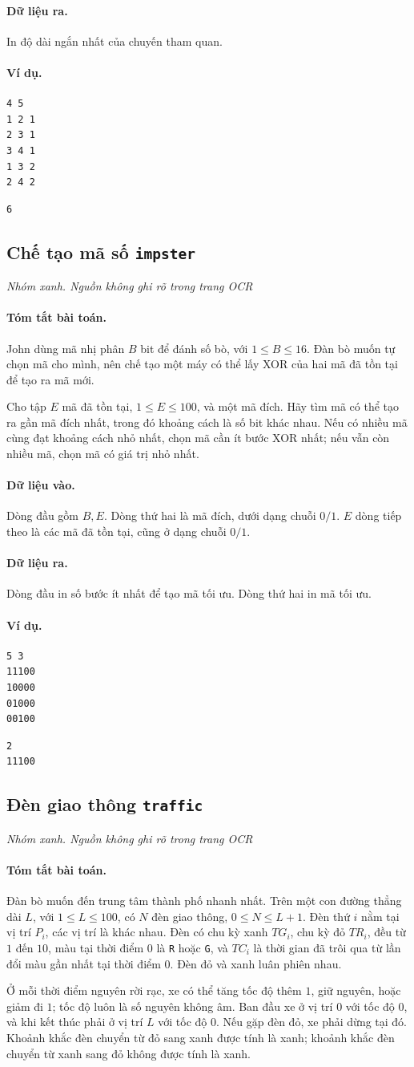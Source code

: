\documentclass[11pt]{article}
\newcommand{\problem}[4]{%
  \subsection[#1 (#2)]{#1 \hfill {\normalsize\texttt{#2}}}%
  \noindent\textit{#3. #4}\par\smallskip
}
\newcommand{\iosec}[1]{\paragraph{#1}}
\begin{document}
\iosec{Dữ liệu ra.}
In độ dài ngắn nhất của chuyến tham quan.

\iosec{Ví dụ.}
\begin{verbatim}
4 5
1 2 1
2 3 1
3 4 1
1 3 2
2 4 2
\end{verbatim}

\begin{verbatim}
6
\end{verbatim}

\problem{Chế tạo mã số}{impster}{Nhóm xanh}{Nguồn không ghi rõ trong trang OCR}

\iosec{Tóm tắt bài toán.}
John dùng mã nhị phân \(B\) bit để đánh số bò, với \(1\le B\le 16\). Đàn bò
muốn tự chọn mã cho mình, nên chế tạo một máy có thể lấy XOR của hai mã đã tồn
tại để tạo ra mã mới.

Cho tập \(E\) mã đã tồn tại, \(1\le E\le 100\), và một mã đích. Hãy tìm mã có
thể tạo ra gần mã đích nhất, trong đó khoảng cách là số bit khác nhau. Nếu có
nhiều mã cùng đạt khoảng cách nhỏ nhất, chọn mã cần ít bước XOR nhất; nếu vẫn
còn nhiều mã, chọn mã có giá trị nhỏ nhất.

\iosec{Dữ liệu vào.}
Dòng đầu gồm \(B,E\). Dòng thứ hai là mã đích, dưới dạng chuỗi \(0/1\). \(E\)
dòng tiếp theo là các mã đã tồn tại, cũng ở dạng chuỗi \(0/1\).

\iosec{Dữ liệu ra.}
Dòng đầu in số bước ít nhất để tạo mã tối ưu. Dòng thứ hai in mã tối ưu.

\iosec{Ví dụ.}
\begin{verbatim}
5 3
11100
10000
01000
00100
\end{verbatim}

\begin{verbatim}
2
11100
\end{verbatim}

\problem{Đèn giao thông}{traffic}{Nhóm xanh}{Nguồn không ghi rõ trong trang OCR}

\iosec{Tóm tắt bài toán.}
Đàn bò muốn đến trung tâm thành phố nhanh nhất. Trên một con đường thẳng dài
\(L\), với \(1\le L\le 100\), có \(N\) đèn giao thông,
\(0\le N\le L+1\). Đèn thứ \(i\) nằm tại vị trí \(P_i\), các vị trí là khác
nhau. Đèn có chu kỳ xanh \(TG_i\), chu kỳ đỏ \(TR_i\), đều từ \(1\) đến \(10\),
màu tại thời điểm \(0\) là \texttt{R} hoặc \texttt{G}, và \(TC_i\) là thời
gian đã trôi qua từ lần đổi màu gần nhất tại thời điểm \(0\). Đèn đỏ và xanh
luân phiên nhau.

Ở mỗi thời điểm nguyên rời rạc, xe có thể tăng tốc độ thêm \(1\), giữ nguyên,
hoặc giảm đi \(1\); tốc độ luôn là số nguyên không âm. Ban đầu xe ở vị trí
\(0\) với tốc độ \(0\), và khi kết thúc phải ở vị trí \(L\) với tốc độ \(0\).
Nếu gặp đèn đỏ, xe phải dừng tại đó. Khoảnh khắc đèn chuyển từ đỏ sang xanh
được tính là xanh; khoảnh khắc đèn chuyển từ xanh sang đỏ không được tính là
xanh.
\end{document}
